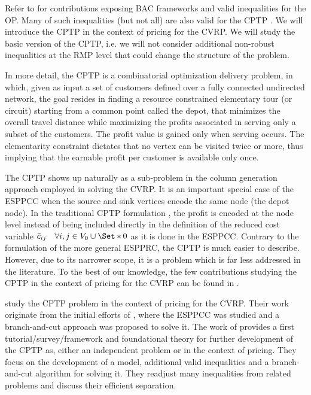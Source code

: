 Refer to \textcite{fischetti1998, gendreau1998} for contributions
exposing BAC frameworks and valid inequalities for the OP.
Many of such inequalities (but not all) are also valid for the CPTP \parencite{jepsen2014}.
We will introduce the CPTP in the context of pricing for the CVRP.
We will study the basic version of the CPTP,
i.e. we will not consider additional non-robust inequalities
at the RMP level that could change the structure of the problem.

\medskip

In more detail,
the CPTP is a combinatorial optimization delivery problem,
in which,
given as input a set of customers
defined over a fully connected undirected network, the goal resides in finding
a resource constrained elementary tour (or circuit) starting from a common point called the depot,
that minimizes the overall travel distance while maximizing
the profits associated in serving only a subset of the customers.
The profit value is gained only when serving occurs.
The elementarity constraint dictates that no vertex
can be visited twice or more, thus implying that the earnable profit
per customer is available only once.

The CPTP shows up naturally as a sub-problem
in the column generation approach employed in solving the CVRP.
It is an important special case of the
ESPPCC when the source and sink vertices encode the same node (the depot node).
In the traditional CPTP formulation \parencite{jepsen2014},
the profit is encoded at the node level
instead of being included directly in the definition
of the reduced cost variable $\bar{c}_{ij} \quad \forall i, j \in V_0 \cup \Set*{0}$
as it is done in the ESPPCC.
Contrary to the formulation of the more general ESPPRC,
the CPTP is much easier to describe.
However, due to its narrower scope,
it is a problem which is far less addressed in the literature.
To the best of our knowledge, the few contributions studying the CPTP
in the context of pricing for the CVRP can be found in \textcite{bixby1999, jepsen2011,jepsen2014}.

\textcite{jepsen2014} study the CPTP problem in the context of pricing for the CVRP.
Their work originate from the initial efforts of \textcite{jepsen2008branchandcut},
where the ESPPCC was studied and a branch-and-cut approach was proposed to solve it.
The work of \citeauthor{jepsen2014} provides a first tutorial/survey/framework
and foundational theory for further development of the CPTP as, either
an independent problem or in the context of pricing.
They focus on the development of a model, additional valid inequalities and
a branch-and-cut algorithm for solving it.
They readjust many inequalities from related problems
and discuss their efficient separation.

